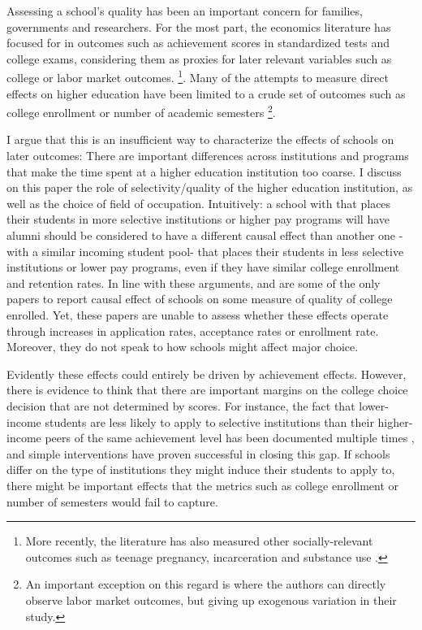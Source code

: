 \documentclass[12pt]{article}
\begin{document}
Assessing a school's quality has been an important concern for families, governments and researchers. For the most part, the economics literature has focused for in outcomes such as achievement scores in  standardized tests and college exams, considering them as proxies for later relevant variables such as college or labor market outcomes. \parencite{chetty_measuring_2014}\footnote{ More recently, the literature has also measured other socially-relevant outcomes such as teenage pregnancy, incarceration and substance use \parencite{dobbie_medium-term_2015, beuermann_what_2023}.}. 
Many of the attempts to measure direct effects on higher education have been limited to a crude set of outcomes such as college enrollment or number of academic semesters \parencite{angrist_stand_2016, dobbie_medium-term_2015}\footnote{An important exception on this regard is \parencite{dobbie_charter_2020} where the authors can directly observe labor market outcomes, but giving up exogenous variation in their study.}.


I argue that this is an insufficient way to characterize the effects of schools on later outcomes: There are important differences across institutions and programs that make the time spent at a higher education institution too coarse. I discuss on this paper the role of selectivity/quality of the higher education institution, as well as the choice of field of occupation. Intuitively: a school with that places their students in more selective institutions or higher pay programs will have alumni should be considered to have a different causal effect than another one -with a similar incoming student pool- that places their students in less selective institutions or lower pay programs, even if they have similar college enrollment and retention rates.  In line with these arguments,  \parencite{abdulkadiroglu_elite_2014} and 
\parencite{abdulkadiroglu_parents_2020} are some of the only papers to report causal effect of schools on some measure of quality of college enrolled. Yet, these papers are unable to assess whether these effects operate through increases in application rates, acceptance rates or enrollment rate. Moreover, they do not speak to how schools might affect major choice. 

Evidently these effects could entirely be driven by achievement effects. However, there is evidence to think that there are important margins on the college choice decision that are not determined by scores.  For instance, the fact that lower-income students are less likely to apply to selective institutions than their higher-income peers of the same achievement level has been documented multiple times  \parencite{dynarski_closing_2021} \parencite{chetty_diversifying_2025}, and simple interventions  \parencite{hoxby_what_2015} have proven successful in closing this gap. If schools differ on the type of institutions they might induce their students to apply to, there might be important effects that the metrics such as college enrollment or number of semesters would fail to capture. 
\end{document}
